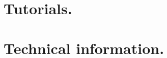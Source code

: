 \documentclass{scrartcl}
\begin{document}


\newpage


\newpage
\tableofcontents

\newpage


\newpage
\part{Tutorials.}

\newpage


\newpage


\newpage


\newpage


\newpage



\newpage
\part{Technical information.}

\newpage


\end{document}
